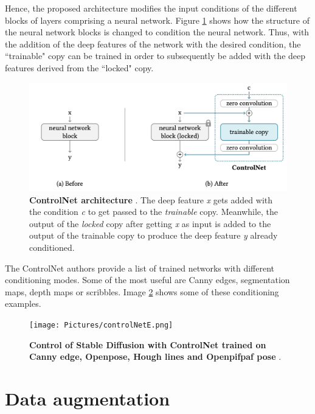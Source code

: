 Hence, the proposed architecture modifies the input conditions of the different blocks of layers comprising a neural network. Figure \ref{fig:controlNetD} shows how the structure of the neural network blocks is changed to condition the neural network. Thus, with the addition of the deep features of the network with the desired condition, the ``trainable" copy can be trained in order to subsequently be added with the deep features derived from the ``locked" copy. 

\begin{figure}
    \centering
    \includegraphics[width=1\textwidth]{Pictures/controlNetD.png} 
    \caption{\textbf{ControlNet architecture} \cite{zhang2023adding}. The deep feature \textit{x} gets added with the condition \textit{c} to get passed to the \textit{trainable} copy. Meanwhile, the output of the \textit{locked} copy after getting \textit{x} as input is added to the output of the trainable copy to produce the deep feature \textit{y} already conditioned.}
    \label{fig:controlNetD}
\end{figure}

The ControlNet authors provide a list of trained networks with different conditioning modes. Some of the most useful are Canny edges, segmentation maps, depth maps or scribbles. Image \ref{fig:controlNetE} shows some of these conditioning examples.

\begin{figure}
    \centering
    \texttt{[image: Pictures/controlNetE.png]} 
    \caption{\textbf{Control of Stable Diffusion with ControlNet trained on Canny edge, Openpose, Hough lines and Openpifpaf pose} \cite{zhang2023adding}.}
    \label{fig:controlNetE}
\end{figure}

\section{Data augmentation}

